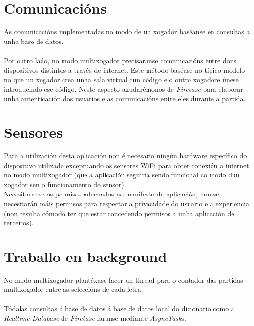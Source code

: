 \section {Comunicacións}
As comunicacións implementadas no modo de un xogador baséanse en consultas a unha base de datos. \\
\\
Por outro lado, no modo multixogador precisaranse comunicacións entre dous dispositivos distintos a través de internet. Este método baséase no típico modelo no que un xogador crea unha sala virtual cun código e o outro xogadore únese introducindo ese código. Neste aspecto axudarémonos de \textit{Firebase} para elaborar unha autenticación dos usuarios e as comunicacións entre eles durante a partida. 
\\ \section {Sensores}
Para a utilización desta aplicación non é necesario ningún hardware específico do dispositivo utilizado exceptuando os sensores WiFi para obter conexión a internet no modo multixogador (que a aplicación seguiría sendo funcional co modo dun xogador sen o funcionamento do sensor).\\
Necesitaranse os permisos adecuados no manifesto da aplicación, non se necesitarán máis permisos para respectar a privacidade do usuario e a experiencia (non resulta cómodo ter que estar concedendo permisos a unha aplicación de terceiros). 

\section {Traballo en background} 
No modo multixogador plantéxase facer un thread  para o contador das partidas multixogador entre as seleccións de cada letra. \\
\\
Tódalas consultas á base de datos á base de datos local do dicionario como a \textit{Realtime Database} de \textit{Firebase} faranse mediante \textit{AsyncTask}s.

\let\cleardoublepage=\clearpage